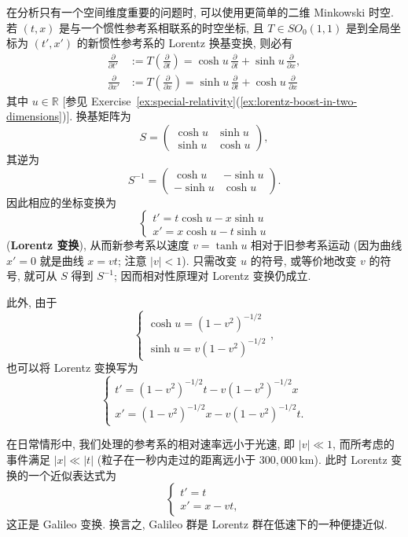 在分析只有一个空间维度重要的问题时, 可以使用更简单的二维 Minkowski 时空. 若 $(t,x)$ 是与一个惯性参考系相联系的时空坐标, 且 $T\in SO_0(1,1)$ 是到全局坐标为 $(t',x')$ 的新惯性参考系的 Lorentz 换基变换, 则必有
\begin{align*}
  \frac{\partial}{\partial t'}&:=T\left(\frac{\partial}{\partial t}\right)
    =\cosh u\,\frac{\partial}{\partial t}+\sinh u\,\frac{\partial}{\partial x},\\
  \frac{\partial}{\partial x'}&:=T\left(\frac{\partial}{\partial x}\right)
    =\sinh u\,\frac{\partial}{\partial t}+\cosh u\,\frac{\partial}{\partial x}
\end{align*}
其中 $u\in\mathbb{R}$ [参见 Exercise~\ref{ex:special-relativity}(\ref{ex:lorentz-boost-in-two-dimensions})]. 换基矩阵为
\[
  S=\begin{pmatrix}\cosh u&\sinh u\\\sinh u&\cosh u\end{pmatrix},
\]
其逆为
\[
  S^{-1}=\begin{pmatrix}\cosh u&-\sinh u\\-\sinh u&\cosh u\end{pmatrix}.
\]
因此相应的坐标变换为
\[
  \begin{cases}
    t'=t\cosh u-x\sinh u\\
    x'=x\cosh u-t\sinh u
  \end{cases}
\]
(\textbf{Lorentz 变换}), 从而新参考系以速度 $v=\tanh u$ 相对于旧参考系运动 (因为曲线 $x'=0$ 就是曲线 $x=vt$; 注意 $|v|<1$). 只需改变 $u$ 的符号, 或等价地改变 $v$ 的符号, 就可从 $S$ 得到 $S^{-1}$; 因而相对性原理对 Lorentz 变换仍成立.

此外, 由于
\[
  \begin{cases}
    \cosh u=(1-v^2)^{-1/2}\\
    \sinh u=v(1-v^2)^{-1/2}
  \end{cases},
\]
也可以将 Lorentz 变换写为
\[
  \begin{cases}
    t'=(1-v^2)^{-1/2}t-v(1-v^2)^{-1/2}x\\
    x'=(1-v^2)^{-1/2}x-v(1-v^2)^{-1/2}t.
  \end{cases}
\]

在日常情形中, 我们处理的参考系的相对速率远小于光速, 即 $|v|\ll1$, 而所考虑的事件满足 $|x|\ll|t|$ (粒子在一秒内走过的距离远小于 $300{,}000\,\mathrm{km}$). 此时 Lorentz 变换的一个近似表达式为
\[
  \begin{cases}
    t'=t\\
    x'=x-vt,
  \end{cases}
\]
这正是 Galileo 变换. 换言之, Galileo 群是 Lorentz 群在低速下的一种便捷近似.

